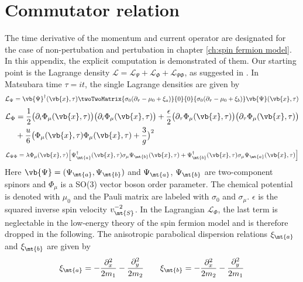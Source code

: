 %
%
%
\chapter{Commutator relation}
\label{appch:commutator}
%
%
%
The time derivative of the momentum and current operator are designated for the case of non-pertubation and pertubation in chapter \ref{ch:spin fermion model}.
In this appendix, the explicit computation is demonstrated of them.
Our starting point is the Lagrange density $\mathcal{L} = \mathcal{L}_{\Psi} + \mathcal{L}_{\Phi} + \mathcal{L}_{\Psi\Phi}$, as suggested in \cite{Patel&Sachdev}.
In Matsubara time $\tau = it$, the single Lagrange densities are given by
%
\begin{align}
	\mathcal{L}_{\Psi} = 
		\vb{\Psi}^{\dag}(\vb{x},\tau)
		\twoTwoMatrix{\sigma_{0} (\partial_{\tau}-\mu_{0}+\xi_{a})}{0}{0}{\sigma_{0} (\partial_{\tau}-\mu_{0}+\xi_{b})}
		\vb{\Psi}(\vb{x},\tau)
\end{align}
%
\begin{align}
	\mathcal{L}_{\Phi} &= 
		\frac{1}{2} \big(\partial_{i}\Phi_{\mu}(\vb{x},\tau)\big) \big(\partial_{i}\Phi_{\mu}(\vb{x},\tau)\big) 
		+ 
		\frac{\epsilon}{2} \big(\partial_{\tau}\Phi_{\mu}(\vb{x},\tau)\big) \big(\partial_{\tau}\Phi_{\mu}(\vb{x},\tau)\big) 
		\notag \\&+
		\frac{u}{6} \big(\Phi_{\mu}(\vb{x},\tau) \Phi_{\mu}(\vb{x},\tau) + \frac{3}{g}\big)^{2}
\end{align}
%
\begin{align}
	\mathcal{L}_{\Psi\Phi} =
		\lambda\Phi_{\mu}(\vb{x},\tau) \Big[\Psi_{\mt{a}}^{\dag}(\vb{x},\tau) \sigma_{\mu} \Psi_{\mt{b}}(\vb{x},\tau) + \Psi_{\mt{b}}^{\dag}(\vb{x},\tau) \sigma_{\mu} \Psi_{\mt{a}}(\vb{x},\tau)\Big]
\end{align}
%
Here $\vb{\Psi} = (\Psi_{\mt{a}}, \Psi_{\mt{b}})$ and $\Psi_{\mt{a}}$, $\Psi_{\mt{b}}$ are two-component spinors and $\Phi_{\mu}$ is a SO(3) vector boson order parameter.
The chemical potential is denoted with $\mu_0$ and the Pauli matrix are labeled with $\sigma_{0}$ and $\sigma_{\mu}$.
$\epsilon$ is the squared inverse spin velocity $v_{\mt{S}}^{-2}$.
In the Lagrangian $\mathcal{L}_{\Phi}$, the last term is neglectable in the low-energy theory of the spin fermion model and is therefore dropped in the following.
The anisotropic parabolical dispersion relations $\xi_{\mt{a}}$ and $\xi_{\mt{b}}$ are given by 
%
\begin{align}
	\xi_{\mt{a}} = - \frac{\partial_{x}^{2}}{2m_{1}} - \frac{\partial_{y}^{2}}{2m_{2}} \qquad \xi_{\mt{b}} = - \frac{\partial_{x}^{2}}{2m_{2}} - \frac{\partial_{y}^{2}}{2m_{1}}
\end{align}
